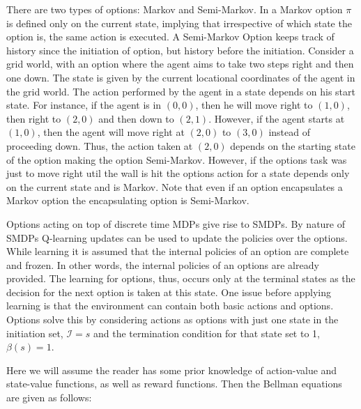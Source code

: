 There are two types of options: Markov and Semi-Markov. In a Markov option \(\pi\) is defined only on the current state, implying that irrespective of which state the option is, the same action is executed. A Semi-Markov Option keeps track of history since the initiation of option, but history before the initiation. Consider a grid world, with an option where the agent aims to take two steps right and then one down. The state is given by the current locational coordinates of the agent in the grid world. The action performed by the agent in a state depends on his start state. For instance, if the agent is in \((0,0)\), then he will move right to \((1,0)\), then right to \((2,0)\) and then down to \((2,1)\). However, if the agent starts at \((1,0)\), then the agent will move right at \((2,0)\) to \((3,0)\) instead of proceeding down. Thus, the action taken at \((2,0)\) depends on the starting state of the option making the option Semi-Markov. However, if the options task was just to move right util the wall is hit the options action for a state depends only on the current state and is Markov. Note that even if an option encapsulates a Markov option the encapsulating option is Semi-Markov.

Options acting on top of discrete time MDPs give rise to SMDPs. By nature of SMDPs Q-learning updates can be used to update the policies over the options. While learning it is assumed that the internal policies of an option are complete and frozen. In other words, the internal policies of an options are already provided. The learning for options, thus, occurs only at the terminal states as the decision for the next option is taken at this state. One issue before applying learning is that the environment can contain both basic actions and options. Options solve this by considering actions as options with just one state in the initiation set, \(\mathcal{I}=s\) and the termination condition for that state set to 1, \(\beta(s)=1\).

Here we will assume the reader has some prior knowledge of action-value and state-value functions, as well as reward functions. Then the Bellman equations are given as follows:

